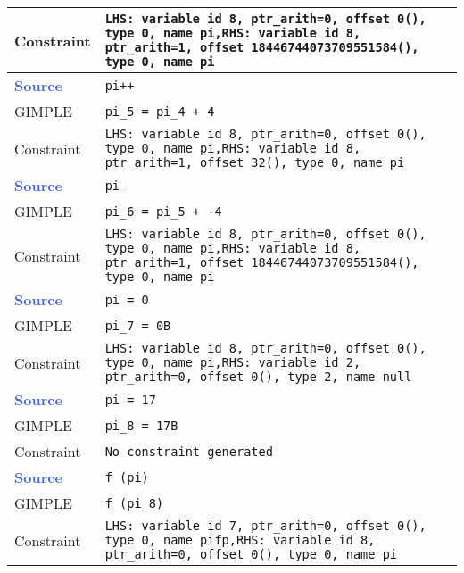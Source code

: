 \begin{center}
\begin{longtable}{| m{10ex} | m{75ex} |}
            Constraint & \texttt{LHS: variable id 8, ptr\_arith=0, offset 0(), type 0, name pi,\newline RHS: variable id 8, ptr\_arith=1, offset 18446744073709551584(), type 0, name pi} \\
            \hline
            \hline
            \textcolor{RoyalBlue}{\textbf{Source}} & \texttt{pi++} \\ \hline
            GIMPLE & \texttt{pi\_5 = pi\_4 + 4} \\ \hline
            Constraint & \texttt{LHS: variable id 8, ptr\_arith=0, offset 0(), type 0, name pi,\newline RHS: variable id 8, ptr\_arith=1, offset 32(), type 0, name pi} \\
            \hline
            \hline
            \textcolor{RoyalBlue}{\textbf{Source}} & \texttt{pi--} \\ \hline
            GIMPLE & \texttt{pi\_6 = pi\_5 + -4} \\ \hline
            Constraint & \texttt{LHS: variable id 8, ptr\_arith=0, offset 0(), type 0, name pi,\newline RHS: variable id 8, ptr\_arith=1, offset 18446744073709551584(), type 0, name pi} \\
            \hline
            \hline
            \textcolor{RoyalBlue}{\textbf{Source}} & \texttt{pi = 0} \\ \hline
            GIMPLE & \texttt{pi\_7 = 0B} \\ \hline
            Constraint & \texttt{LHS: variable id 8, ptr\_arith=0, offset 0(), type 0, name pi,\newline RHS: variable id 2, ptr\_arith=0, offset 0(), type 2, name null} \\
            \hline
            \hline
            \textcolor{RoyalBlue}{\textbf{Source}} & \texttt{pi = 17} \\ \hline
            GIMPLE & \texttt{pi\_8 = 17B} \\ \hline
            Constraint & \texttt{\textcolor{BrickRed}{No constraint generated}} \\
            \hline
            \hline
            \textcolor{RoyalBlue}{\textbf{Source}} & \texttt{f (pi)} \\ \hline
            GIMPLE & \texttt{f (pi\_8)} \\ \hline
            Constraint & \texttt{LHS: variable id 7, ptr\_arith=0, offset 0(), type 0, name pifp,\newline RHS: variable id 8, ptr\_arith=0, offset 0(), type 0, name pi} \\

\end{longtable}
\end{center}
